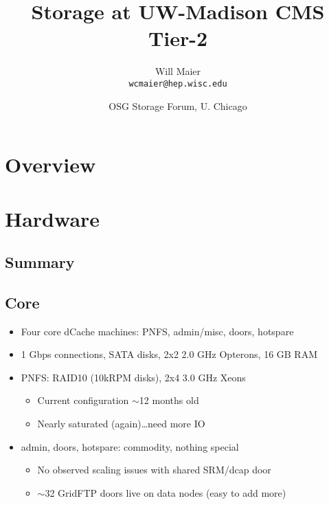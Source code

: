 \documentclass{beamer}
\title{Storage at UW-Madison CMS Tier-2}
\author[Maier]{
    Will Maier \\ 
    {\tt wcmaier@hep.wisc.edu}}
\institute[Wisconsin]{University of Wisconsin - High Energy Physics}
\date[2010.09.22]{OSG Storage Forum, U. Chicago}
\newcommand{\ca}{\ensuremath{\sim}}
\begin{document}

\begin{frame}
    \titlepage
\end{frame}

\section{Overview}
\begin{frame}
    \tableofcontents
\end{frame}

\section{Hardware}
\subsection{Summary}
\subsection{Core}
\begin{frame}
\begin{itemize}
	\item Four core dCache machines: PNFS, admin/misc, doors, hotspare
	\item 1 Gbps connections, SATA disks, 2x2 2.0 GHz Opterons, 16 GB RAM
	\item PNFS: RAID10 (10kRPM disks), 2x4 3.0 GHz Xeons
	\begin{itemize}
		\item Current configuration \ca{}12 months old
		\item Nearly saturated (again)\ldots{}need more IO
	\end{itemize}
	\item admin, doors, hotspare: commodity, nothing special
	\begin{itemize}
		\item No observed scaling issues with shared SRM/dcap door
		\item \ca{}32 GridFTP doors live on data nodes (easy to add more)
	\end{itemize}
\end{itemize}
\end{frame}
\end{document}

